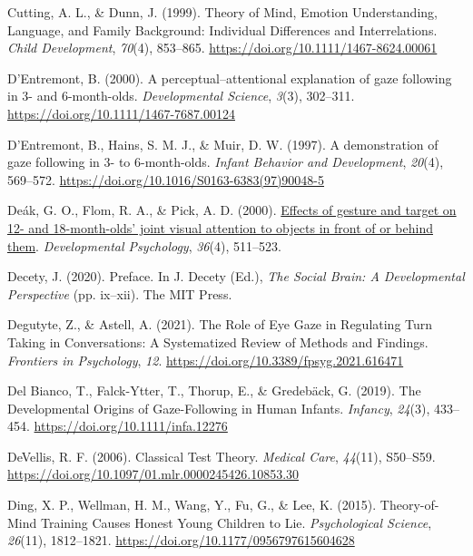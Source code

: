 \documentclass[
]{scrbook}
\newlength{\cslhangindent}
\newenvironment{CSLReferences}[2] %
 {\begin{list}{}{%
  \setlength{\itemindent}{0pt}
  \setlength{\leftmargin}{0pt}
  \setlength{\parsep}{0pt}
  \ifodd #1
   \setlength{\leftmargin}{\cslhangindent}
   \setlength{\itemindent}{-1\cslhangindent}
  \fi
  \setlength{\itemsep}{#2\baselineskip}}}
 {\end{list}}
\begin{document}
\begin{CSLReferences}{1}{0}
Cutting, A. L., \& Dunn, J. (1999). Theory of {Mind}, {Emotion Understanding}, {Language}, and {Family Background}: {Individual Differences} and {Interrelations}. \emph{Child Development}, \emph{70}(4), 853--865. \url{https://doi.org/10.1111/1467-8624.00061}

D'Entremont, B. (2000). A perceptual--attentional explanation of gaze following in 3- and 6-month-olds. \emph{Developmental Science}, \emph{3}(3), 302--311. \url{https://doi.org/10.1111/1467-7687.00124}

D'Entremont, B., Hains, S. M. J., \& Muir, D. W. (1997). A demonstration of gaze following in 3- to 6-month-olds. \emph{Infant Behavior and Development}, \emph{20}(4), 569--572. \url{https://doi.org/10.1016/S0163-6383(97)90048-5}

Deák, G. O., Flom, R. A., \& Pick, A. D. (2000). \href{https://www.ncbi.nlm.nih.gov/pubmed/10902702}{Effects of gesture and target on 12- and 18-month-olds' joint visual attention to objects in front of or behind them}. \emph{Developmental Psychology}, \emph{36}(4), 511--523.

Decety, J. (2020). Preface. In J. Decety (Ed.), \emph{The {Social Brain}: {A Developmental Perspective}} (pp. ix--xii). The MIT Press.

Degutyte, Z., \& Astell, A. (2021). The {Role} of {Eye Gaze} in {Regulating Turn Taking} in {Conversations}: {A Systematized Review} of {Methods} and {Findings}. \emph{Frontiers in Psychology}, \emph{12}. \url{https://doi.org/10.3389/fpsyg.2021.616471}

Del Bianco, T., Falck-Ytter, T., Thorup, E., \& Gredebäck, G. (2019). The {Developmental Origins} of {Gaze-Following} in {Human Infants}. \emph{Infancy}, \emph{24}(3), 433--454. \url{https://doi.org/10.1111/infa.12276}

DeVellis, R. F. (2006). Classical {Test Theory}. \emph{Medical Care}, \emph{44}(11), S50--S59. \url{https://doi.org/10.1097/01.mlr.0000245426.10853.30}

Ding, X. P., Wellman, H. M., Wang, Y., Fu, G., \& Lee, K. (2015). Theory-of-{Mind Training Causes Honest Young Children} to {Lie}. \emph{Psychological Science}, \emph{26}(11), 1812--1821. \url{https://doi.org/10.1177/0956797615604628}


\end{CSLReferences}
\end{document}
